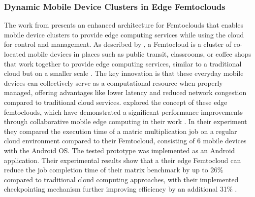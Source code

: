 \subsubsection{Dynamic Mobile Device Clusters in Edge Femtoclouds}
The work from \citeauthor{relatedwork:mobilecloud} \cite{relatedwork:mobilecloud} presents an enhanced architecture for Femtoclouds that enables mobile device clusters to provide edge computing services while using the cloud for control and management. As described by \citeauthor{relatedwork:mobilecloud}, a Femtocloud is a cluster of co-located mobile devices in places such as public transit, classrooms, or coffee shops that work together to provide edge computing services, similar to a traditional cloud but on a smaller scale \cite{relatedwork:mobilecloud}. The key innovation is that these everyday mobile devices can collectively serve as a computational resource when properly managed, offering advantages like lower latency and reduced network congestion compared to traditional cloud services. \citeauthor{relatedwork:mobilecloud} explored the concept of these edge femtoclouds, which have demonstrated a significant performance improvements through collaborative mobile edge computing in their work \cite{relatedwork:mobilecloud}. In their experiment they compared the execution time of a matric multiplication job on a regular cloud environment compared to their Femtocloud, consisting of 6 mobile devices with the Android \ac{OS}. The tested prototype was implemented as an Android application. Their experimental results show that a their edge Femtocloud can reduce the job completion time of their matrix benchmark by up to 26\% compared to traditional cloud computing approaches, with their implemented checkpointing mechanism further improving efficiency by an additional 31\% \cite{relatedwork:mobilecloud}. 

